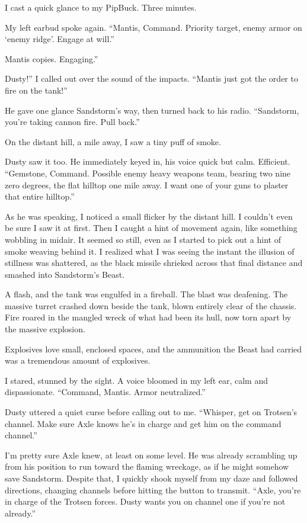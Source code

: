 I cast a quick glance to my PipBuck. Three minutes.

My left earbud spoke again. “Mantis, Command. Priority target, enemy armor on ‘enemy ridge’. Engage at will.”

\leavevmode{}Mantis copies. Engaging.”

\leavevmode{}Dusty!” I called out over the sound of the impacts. “Mantis just got the order to fire on the tank!”

He gave one glance Sandstorm’s way, then turned back to his radio. “Sandstorm, you’re taking cannon fire. Pull back.”

On the distant hill, a mile away, I saw a tiny puff of smoke.

Dusty saw it too. He immediately keyed in, his voice quick but calm. Efficient. “Gemstone, Command. Possible enemy heavy weapons team, bearing two nine zero degrees, the flat hilltop one mile away. I want one of your guns to plaster that entire hilltop.”

As he was speaking, I noticed a small flicker by the distant hill. I couldn’t even be sure I saw it at first. Then I caught a hint of movement again, like something wobbling in midair. It seemed so still, even as I started to pick out a hint of smoke weaving behind it. I realized what I was seeing the instant the illusion of stillness was shattered, as the black missile shrieked across that final distance and smashed into Sandstorm’s Beast.

A flash, and the tank was engulfed in a fireball. The blast was deafening. The massive turret crashed down beside the tank, blown entirely clear of the chassis. Fire roared in the mangled wreck of what had been its hull, now torn apart by the massive explosion.

Explosives love small, enclosed spaces, and the ammunition the Beast had carried was a tremendous amount of explosives.

I stared, stunned by the sight. A voice bloomed in my left ear, calm and dispassionate. “Command, Mantis. Armor neutralized.”

Dusty uttered a quiet curse before calling out to me. “Whisper, get on Trotsen’s channel. Make sure Axle knows he’s in charge and get him on the command channel.”

I’m pretty sure Axle knew, at least on some level. He was already scrambling up from his position to run toward the flaming wreckage, as if he might somehow save Sandstorm. Despite that, I quickly shook myself from my daze and followed directions, changing channels before hitting the button to transmit. “Axle, you’re in charge of the Trotsen forces. Dusty wants you on channel one if you’re not already.”

